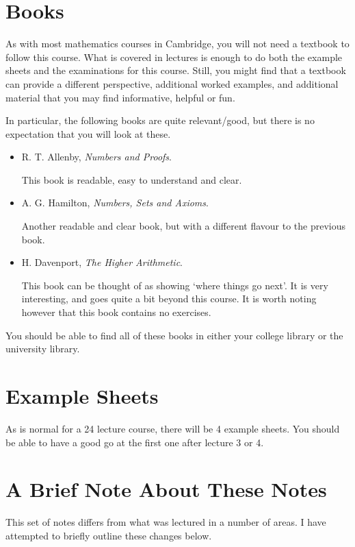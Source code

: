 \documentclass[a4paper]{scrreprt}
\begin{document}
\section{Books}

As with most mathematics courses in Cambridge, you will not need a textbook to follow this course. What is covered in lectures is enough to do both the example sheets and the examinations for this course. Still, you might find that a textbook can provide a different perspective, additional worked examples, and additional material that you may find informative, helpful or fun.

In particular, the following books are quite relevant/good, but there is no expectation that you will look at these.

\begin{itemize}
	\item R. T. Allenby, \emph{Numbers and Proofs}.
	
	This book is readable, easy to understand and clear.

	\item A. G. Hamilton, \emph{Numbers, Sets and Axioms}.
	
	Another readable and clear book, but with a different flavour to the previous book.

	\item H. Davenport, \emph{The Higher Arithmetic}.

	This book can be thought of as showing `where things go next'. It is very interesting, and goes quite a bit beyond this course. It is worth noting however that this book contains no exercises.
\end{itemize}

You should be able to find all of these books in either your college library or the university library.

\section{Example Sheets}

As is normal for a 24 lecture course, there will be 4 example sheets. You should be able to have a good go at the first one after lecture 3 or 4.

\section{A Brief Note About These Notes}

This set of notes differs from what was lectured in a number of areas. I have attempted to briefly outline these changes below.
\end{document}
